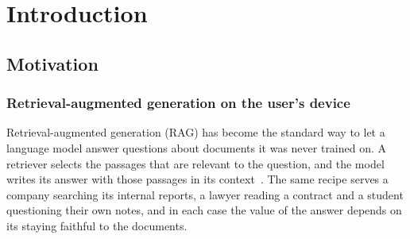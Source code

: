 \chapter{Introduction}
\label{sec:introduction}


\section{Motivation}
\label{sec:intro-motivation}

\subsection{Retrieval-augmented generation on the user's device}
\label{sec:intro-local}

Retrieval-augmented generation (RAG) has become the standard way to let a language model answer questions about documents it
was never trained on. A retriever selects the passages that are relevant to the question, and the model writes its answer
with those passages in its context~\cite{lewis2020rag}. The same recipe serves a company searching its internal reports,
a lawyer reading a contract and a student questioning their own notes, and in each case the value of the answer depends
on its staying faithful to the documents.

